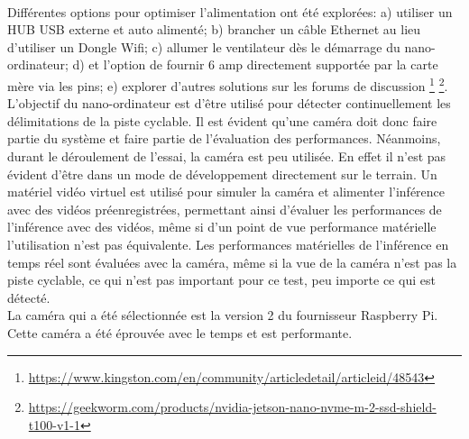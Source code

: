 \vspace{0.5\baselineskip}
\\
\noindent Différentes options pour optimiser l'alimentation ont été explorées: a) utiliser un HUB USB externe et auto alimenté; b) brancher un câble Ethernet au lieu d'utiliser un Dongle Wifi; c) allumer le ventilateur dès le démarrage du nano-ordinateur; d) et l'option de fournir 6 amp directement supportée par la carte mère via les pins; e) explorer d'autres solutions sur les forums de discussion \footnote{\url{https://www.kingston.com/en/community/articledetail/articleid/48543}} \footnote{\url{https://geekworm.com/products/nvidia-jetson-nano-nvme-m-2-ssd-shield-t100-v1-1}}.
\vspace{0.5\baselineskip}
\\
\noindent L'objectif du nano-ordinateur est d'être utilisé pour détecter continuellement les délimitations de la piste cyclable. Il est évident qu'une caméra doit donc faire partie du système et faire partie de l'évaluation des performances. Néanmoins, durant le déroulement de l'essai, la caméra est peu utilisée. En effet il n'est pas évident d'être dans un mode de développement directement sur le terrain. Un matériel vidéo virtuel est utilisé pour simuler la caméra et alimenter l'inférence avec des vidéos préenregistrées, permettant ainsi d'évaluer les performances de l'inférence avec des vidéos, même si d'un point de vue performance matérielle l'utilisation n'est pas équivalente. Les performances matérielles de l'inférence en temps réel sont évaluées avec la caméra, même si la vue de la caméra n'est pas la piste cyclable, ce qui n'est pas important pour ce test, peu importe ce qui est détecté. 
\vspace{0.5\baselineskip}
\\
\noindent La caméra qui a été sélectionnée est la version 2 du fournisseur Raspberry Pi. Cette caméra a été éprouvée avec le temps et est performante. 
\vspace{0.5\baselineskip}
\\
